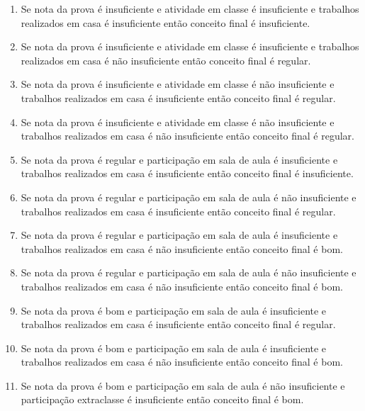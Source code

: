 \documentclass{article}
\begin{document}
\begin{enumerate}

	\item Se nota da prova é insuficiente e atividade em
		classe é insuficiente e trabalhos realizados em casa é
		insuficiente então conceito final é insuficiente.

	\item Se nota da prova é insuficiente e atividade em
		classe é insuficiente e trabalhos realizados em casa é não
		insuficiente então conceito final é regular.

	\item Se nota da prova é insuficiente e atividade em
		classe é não insuficiente e trabalhos realizados em casa é
		insuficiente então conceito final é regular.

	\item  Se nota da prova é insuficiente e atividade em
		classe é não insuficiente e trabalhos realizados em casa é não
		insuficiente então conceito final é regular.

	\item Se nota da prova é regular e participação em sala de aula
		é insuficiente e trabalhos realizados em casa é insuficiente
		então conceito final é insuficiente.

	\item Se nota da prova é regular e participação em sala de aula
		é não insuficiente e trabalhos realizados em casa é
		insuficiente então conceito final é regular.

	\item  Se nota da prova é regular e participação em sala de aula
		é insuficiente e trabalhos realizados em casa é não
		insuficiente então conceito final é bom.

	\item  Se nota da prova é regular e participação em sala de aula
		é não insuficiente e trabalhos realizados em casa é não
		insuficiente então conceito final é bom.

	\item  Se nota da prova é bom e participação em sala de aula é
		insuficiente e trabalhos realizados em casa é insuficiente
		então conceito final é regular.

	\item Se nota da prova é bom e participação em sala de aula é
		insuficiente e trabalhos realizados em casa é não insuficiente
		então conceito final é bom.

	\item Se nota da prova é bom e participação em sala de aula é não
		insuficiente e participação extraclasse é insuficiente
		então conceito final é bom.


\end{enumerate}
\end{document}
